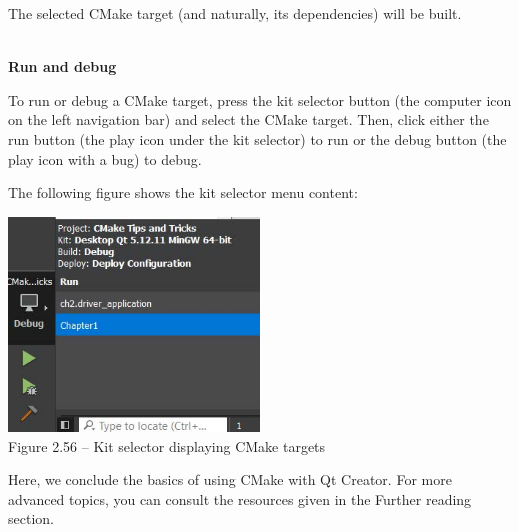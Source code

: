 The selected CMake target (and naturally, its dependencies) will be built.

\hspace*{\fill} \\ %
\noindent
\textbf{Run and debug}

To run or debug a CMake target, press the kit selector button (the computer icon on the left navigation bar) and select the CMake target. Then, click either the run button (the play icon under the kit selector) to run or the debug button (the play icon with a bug) to debug.

The following figure shows the kit selector menu content:

\begin{center}
\includegraphics[width=0.5\textwidth]{content/1/chapter2/images/56.jpg}\\
Figure 2.56 – Kit selector displaying CMake targets
\end{center}

Here, we conclude the basics of using CMake with Qt Creator. For more advanced topics, you can consult the resources given in the Further reading section.

















